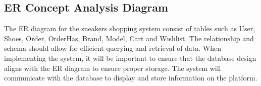 \subsection{ER Concept Analysis Diagram}
\hspace{1cm} The ER diagram for the sneakers shopping system consist of tables such as User, Shoes, Order,
OrderHas, Brand, Model, Cart and Wishlist. The relationship and schema should allow for efficient
querying and retrieval of data. When implementing the system, it will be important to ensure that the
database design aligns with the ER diagram to ensure proper storage. The system will communicate with
the database to display and store information on the platform.
